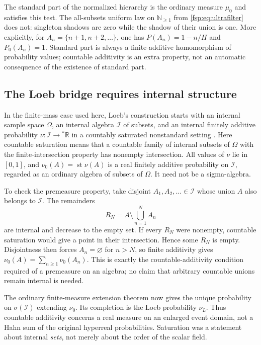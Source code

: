 \documentclass[11pt,a4paper]{article}
\numberwithin{equation}{section}
\theoremstyle{definition}
\theoremstyle{remark}
\newcommand{\R}{\mathbb R}
\newcommand{\N}{\mathbb N}
\newcommand{\st}{\operatorname{st}}
\begin{document}
The standard part of the normalized hierarchy is the ordinary measure
$\mu_0$ and satisfies this test. The all-subsets uniform law on
$\N_{\ge1}$ from \eqref{fsp:eq:ultrafilter} does not: singleton shadows are zero while
the shadow of their union is one. More explicitly, for
$A_n=\{n+1,n+2,\ldots\}$, one has
$P(A_n)=1-n/H$ and $P_0(A_n)=1$. Standard part is always a finite-additive
homomorphism of probability values; countable additivity is an extra
property, not an automatic consequence of the existence of standard part.

\subsection{The Loeb bridge requires internal structure}

In the finite-mass case used here, Loeb's construction starts with
an internal sample space $\Omega$, an internal algebra $\mathcal I$ of
subsets, and an internal finitely additive probability
$\nu:\mathcal I\to{}^*\R$ in a countably saturated nonstandard setting
\cite{loeb}. Here countable saturation means that a countable family of
internal subsets of $\Omega$ with the finite-intersection property has
nonempty intersection. All values of $\nu$ lie in $[0,1]$, and
$\nu_0(A)=\st\nu(A)$ is a real finitely additive probability on
$\mathcal I$, regarded as an ordinary algebra of subsets of $\Omega$.
It need not be a sigma-algebra.

To check the premeasure property, take disjoint $A_1,A_2,\ldots\in\mathcal I$
whose union $A$ also belongs to $\mathcal I$. The remainders
\[
 R_N=A\setminus\bigcup_{n=1}^N A_n
\]
are internal and decrease to the empty set. If every $R_N$ were nonempty,
countable saturation would give a point in their intersection. Hence some
$R_N$ is empty. Disjointness then forces $A_n=\varnothing$ for $n>N$,
so finite additivity gives $\nu_0(A)=\sum_{n\ge1}\nu_0(A_n)$.
This is exactly the countable-additivity condition required of a
premeasure on an algebra; no claim that arbitrary countable unions
remain internal is needed.

The ordinary finite-measure extension theorem now gives the unique
probability on $\sigma(\mathcal I)$ extending $\nu_0$. Its completion
is the Loeb probability $\nu_L$. Thus countable additivity concerns a
real measure on an enlarged event domain, not a Hahn sum of the original
hyperreal probabilities. Saturation was a statement about internal
\emph{sets}, not merely about the order of the scalar field.
\end{document}
